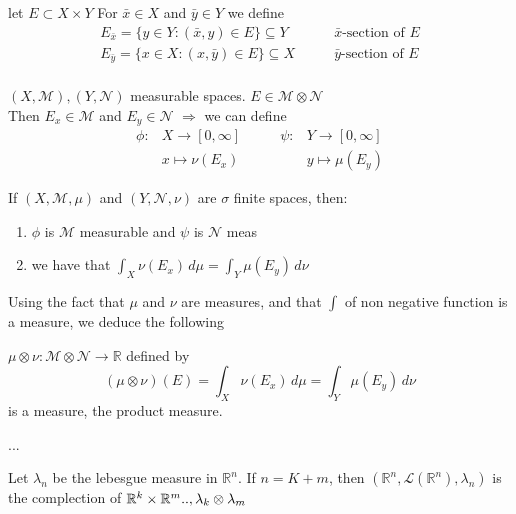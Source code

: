 \begin{definition}
    let \(E \subset X \times Y \) For \( \bar{x} \in X \) and \(\bar{y} \in Y \) we define
\[ 
    \begin{array}{ll}
        E_{\bar{x}} = \{ y \in Y: \left( \bar{x}, y \right) \in E \} \subseteq Y & \qquad \bar{x} \text{-section of } E \\
        E_{\bar{y}} = \{ x \in X: \left( x, \bar{y} \right) \in E \} \subseteq X & \qquad \bar{y} \mbox{-section of } E \\
    \end{array}
\]
\end{definition}

\begin{proposition}
    \(\left( X, \mathcal{M} \right), \left( Y, \mathcal{N} \right)\) measurable spaces. \(E \in \mathcal{M} \otimes \mathcal{N}\) \\
    Then \(E_x \in \mathcal{M} \) and \(E_y \in \mathcal{N} \) 
    \(\Rightarrow \) we can define 
    \[
    \begin{array}{rlrl}
        \phi : & X \rightarrow \left[ 0, \infty \right] & \qquad  \psi : &Y \rightarrow \left[ 0, \infty \right] \\
                & x \mapsto \nu(E_x) & & y \mapsto \mu(E_y) 
        
    \end{array}    
    \]
\end{proposition}


\begin{theorem}
    If \(\left(X, \mathcal{M}, \mu \right)\) and \(\left(Y, \mathcal{N}, \nu \right)\) are \(\sigma\) finite spaces, then:
    \begin{enumerate}
        \item \(\phi\) is \(\mathcal{M}\) measurable and \(\psi\) is \( \mathcal{N}\) meas
        \item we have that \(\int_X \nu(E_x) \, d\mu = \int_Y \mu(E_y) \, d\nu \)
    \end{enumerate}
\end{theorem}

Using the fact that \(\mu \) and \(\nu\) are measures, and that \(\int\) of non negative function is a measure, we deduce the following

\begin{theorem}
    \(\mu \otimes \nu : \mathcal{M} \otimes \mathcal{N} \rightarrow \mathbb{R} \) defined by
    \[ \left(\mu \otimes \nu \right)(E) = \int_X \nu(E_x) \, d\mu = \int_Y \mu(E_y) \, d\nu\]
    is a measure, the product measure.
\end{theorem}

...
\begin{theorem}
    Let \(\lambda_n\) be the lebesgue measure in \(\mathbb{R}^n\). If \(n= K+m\), then \(\left(\mathbb{R}^n, \mathcal{L}(\mathbb{R}^n), \lambda_n \right)\) is the complection of \(\mathbb{R}^k \times \mathbb{R}^m .., \lambda_k \otimes \lambda_m\)
\end{theorem}
